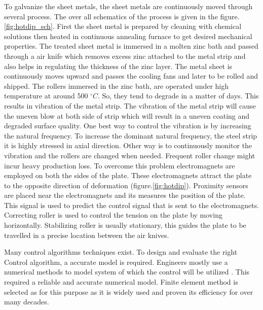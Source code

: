 \documentclass[main.tex]{subfiles}
\begin{document}
To galvanize the sheet metals,  the sheet metals are continuously moved through several process. The over all schematics of the process is given in the figure.\ref{fig:hotdip_sch}. First the sheet metal is prepared by cleaning with chemical solutions then heated in continuous annealing furnace to get desired mechanical properties. The treated sheet metal is immersed in a molten zinc bath and passed through a air knife which removes excess zinc attached to the metal strip and also helps in regulating the thickness of the zinc  layer. The metal sheet is continuously moves upward and passes the cooling fans and later to be rolled and shipped. The rollers immersed in the zinc bath, are operated under high temperature at around 500 $^{\circ}C$. So, they tend to degrade in a matter of days. This results in vibration of the metal strip. The vibration of the metal strip will cause the uneven blow at both side of strip which will result in a uneven coating and degraded surface quality. One best way to control the vibration is by increasing the natural frequency. To increase the dominant natural frequency, the steel strip it is highly stressed in axial direction. Other way is to continuously monitor the vibration and the rollers are changed when needed. Frequent roller change might incur heavy production loss. To overcome this problem electromagnets are employed on both the sides of the plate. These electromagnets attract the plate to the opposite direction of deformation (figure.\ref{fig:hotdip}). Proximity sensors are placed near the electromagnets and its measures the position of the plate. This signal is used to predict the control signal that is sent to the electromagnets. Correcting roller is used to control the tension on the plate by moving horizontally.  Stabilizing roller is usually stationary, this guides the plate to be travelled in a precise location between the air knives. 

 
 Many control algorithms techniques exist. To design and evaluate the right Control algorithm, a accurate model is required.  Engineers mostly use a numerical methods to model system of which the control will be utilized . This required a reliable and accurate numerical model. Finite element method is selected as for this purpose as it is widely used and proven its efficiency for over many decades. 
\end{document}
